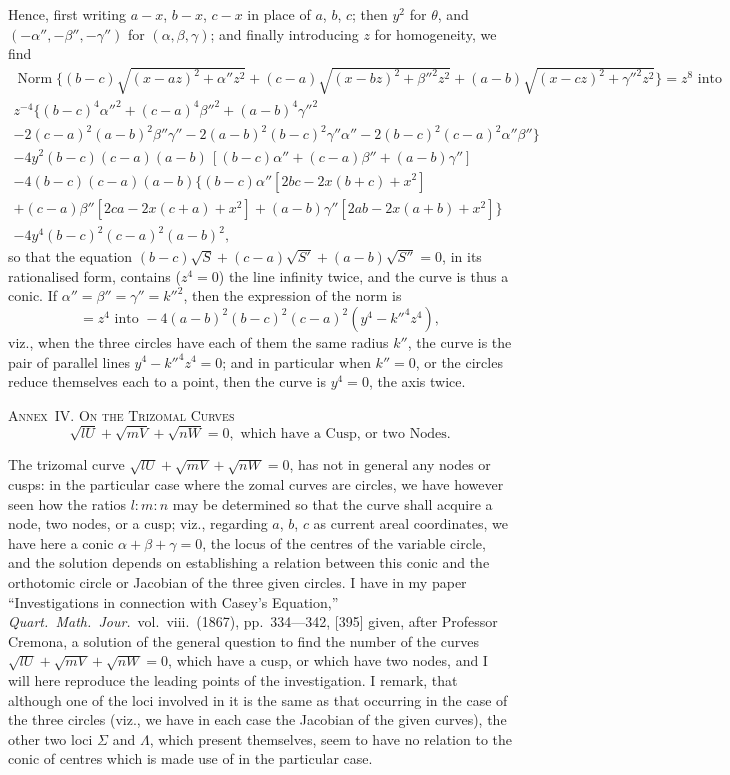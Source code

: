 \documentclass[11pt,a4paper]{article}
\theoremstyle{plain}
\theoremstyle{definition}
\theoremstyle{remark}
\DeclareMathOperator{\Norm}{Norm}
\begin{document}
\newpage
\setcounter{page}{603}

Hence, first writing $a-x$, $b-x$, $c-x$ in place of $a$, $b$, $c$; then $y^2$ for $\theta$, and $(-\alpha'',-\beta'',-\gamma'')$ for $(\alpha,\beta,\gamma)$; and finally introducing $z$ for homogeneity, we find
\begin{multline*}
\Norm\{(b-c)\sqrt{(x-az)^2+\alpha''z^2}+(c-a)\sqrt{(x-bz)^2+\beta''^2z^2}+(a-b)\sqrt{(x-cz)^2+\gamma''^2z^2}\}=z^8\text{ into}\\
z^{-4}\{(b-c)^4\alpha''^2+(c-a)^4\beta''^2+(a-b)^4\gamma''^2\\
-2(c-a)^2(a-b)^2\beta''\gamma''-2(a-b)^2(b-c)^2\gamma''\alpha''-2(b-c)^2(c-a)^2\alpha''\beta''\}\\
-4y^2(b-c)(c-a)(a-b)\,[(b-c)\alpha''+(c-a)\beta''+(a-b)\gamma'']\\
-4(b-c)(c-a)(a-b)\{(b-c)\alpha''[2bc-2x(b+c)+x^2]\\
+(c-a)\beta''[2ca-2x(c+a)+x^2]+(a-b)\gamma''[2ab-2x(a+b)+x^2]\}\\
-4y^4(b-c)^2(c-a)^2(a-b)^2,
\end{multline*}
so that the equation $(b-c)\sqrt{S}+(c-a)\sqrt{S'}+(a-b)\sqrt{S''}=0$, in its rationalised form, contains ($z^4=0$) the line infinity twice, and the curve is thus a conic. If $\alpha''=\beta''=\gamma''=k''^2$, then the expression of the norm is
\[
=z^4\text{ into }-4(a-b)^2(b-c)^2(c-a)^2(y^4-k''^4z^4),
\]
viz., when the three circles have each of them the same radius $k''$, the curve is the pair of parallel lines $y^4-k''^4z^4=0$; and in particular when $k''=0$, or the circles reduce themselves each to a point, then the curve is $y^4=0$, the axis twice.

\smallskip

\noindent\textsc{Annex~IV. On the Trizomal Curves}
\[
\sqrt{lU}+\sqrt{mV}+\sqrt{nW}=0,\text{ which have a Cusp, or two Nodes.}
\]

The trizomal curve $\sqrt{lU}+\sqrt{mV}+\sqrt{nW}=0$, has not in general any nodes or cusps: in the particular case where the zomal curves are circles, we have however seen how the ratios $l:m:n$ may be determined so that the curve shall acquire a node, two nodes, or a cusp; viz., regarding $a$, $b$, $c$ as current areal coordinates, we have here a conic $\alpha+\beta+\gamma=0$, the locus of the centres of the variable circle, and the solution depends on establishing a relation between this conic and the orthotomic circle or Jacobian of the three given circles. I have in my paper ``Investigations in connection with Casey's Equation,'' \textit{Quart.\ Math.\ Jour.}\ vol.~viii.\ (1867), pp.~334---342, [395] given, after Professor Cremona, a solution of the general question to find the number of the curves $\sqrt{lU}+\sqrt{mV}+\sqrt{nW}=0$, which have a cusp, or which have two nodes, and I will here reproduce the leading points of the investigation. I remark, that although one of the loci involved in it is the same as that occurring in the case of the three circles (viz., we have in each case the Jacobian of the given curves), the other two loci $\Sigma$ and $\Lambda$, which present themselves, seem to have no relation to the conic of centres which is made use of in the particular case.
\end{document}
